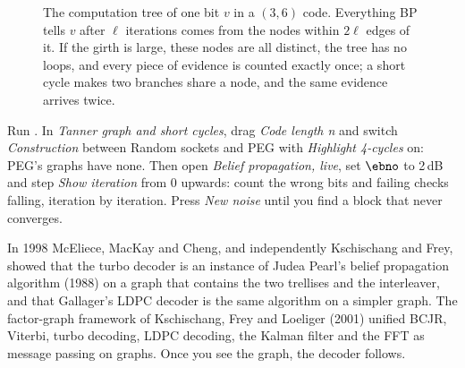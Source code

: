 \begin{figure}[H]\centering
{}
\caption{The computation tree of one bit $v$ in a $(3,6)$ code. Everything BP tells $v$ after
$\ell$ iterations comes from the nodes within $2\ell$ edges of it. If the girth is large, these
nodes are all distinct, the tree has no loops, and every piece of evidence is counted exactly
once; a short cycle makes two branches share a node, and the same evidence arrives twice.}
\label{fig:ch15_comptree}
\end{figure}

\begin{tryit}
Run . In \emph{Tanner graph and short cycles}, drag
\emph{Code length n} and switch \emph{Construction} between Random sockets and PEG with
\emph{Highlight 4-cycles} on: PEG's graphs have none. Then open \emph{Belief propagation, live},
set $\ebno$ to 2\,dB and step \emph{Show iteration} from 0 upwards: count the wrong bits and
failing checks falling, iteration by iteration. Press \emph{New noise} until you find a block that
never converges.
\end{tryit}

\begin{keyidea}
In 1998 McEliece, MacKay and Cheng, and independently Kschischang and Frey, showed that the turbo
decoder is an instance of Judea Pearl's belief propagation algorithm (1988) on a graph that contains
the two trellises and the interleaver, and that Gallager's LDPC decoder is the same algorithm on a
simpler graph. The factor-graph framework of Kschischang, Frey and Loeliger (2001) unified BCJR,
Viterbi, turbo decoding, LDPC decoding, the Kalman filter and the FFT as message passing on graphs.
Once you see the graph, the decoder follows.
\end{keyidea}

